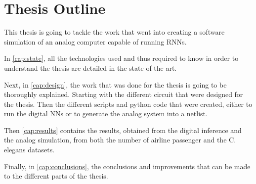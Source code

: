 \section{Thesis Outline}
\label{sec:outline}

This thesis is going to tackle the work that went into creating a software simulation of an analog computer capable of running \aclp{RNN}.

In \cref{cap:state}, all the technologies used and thus required to know in order to understand the thesis are detailed in the state of the art.

Next, in \cref{cap:design}, the work that was done for the thesis is going to be thoroughly explained. Starting with the different circuit that were designed for the thesis. Then the different scripts and python code that were created, either to run the digital \acp{NN} or to generate the analog system into a netlist.

Then \cref{cap:results} contains the results, obtained from the digital inference and the analog simulation, from both the number of airline passenger and the \ac{C. elegans} datasets.

Finally, in \cref{cap:conclusions}, the conclusions and improvements that can be made to the different parts of the thesis.
